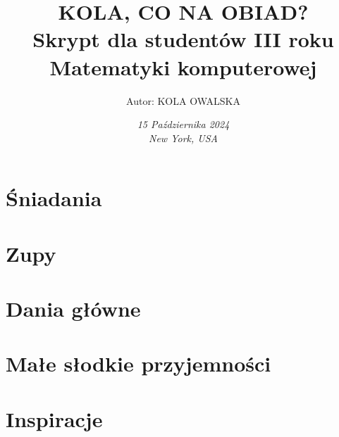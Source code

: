 \documentclass[a4paper,10pt]{book}
\title{\Huge \textbf{KOLA, CO NA OBIAD?}\\
\vspace{0.5cm}
\Large Skrypt dla studentów III roku Matematyki komputerowej}
\author{Autor: KOLA OWALSKA}
\date{\vfill \large \textit{15 Października 2024}\\
\textit{New York, USA}}
\begin{document}
\maketitle
\newpage



\renewcommand{\contentsname}{Spis treści}
\tableofcontents
\newpage


\chapter{Śniadania}






\chapter{Zupy}




\chapter{Dania główne}









\chapter{Małe słodkie przyjemności}




\chapter{Inspiracje}

\end{document}
